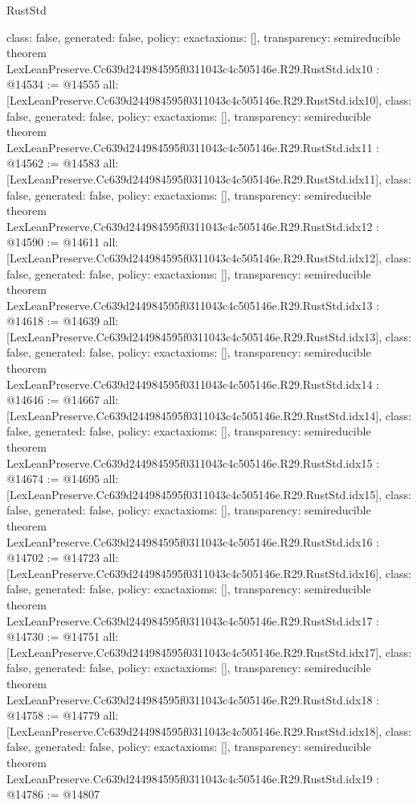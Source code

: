\begin{lexlean}{RustStd}
\begin{coremodule}
{  class: false,
  generated: false,
  policy: exact{axioms: []},
  transparency: semireducible
}
theorem LexLeanPreserve.Cc639d244984595f0311043c4c505146e.R29.RustStd.idx10 : @14534 := @14555 {
  all: [LexLeanPreserve.Cc639d244984595f0311043c4c505146e.R29.RustStd.idx10],
  class: false,
  generated: false,
  policy: exact{axioms: []},
  transparency: semireducible
}
theorem LexLeanPreserve.Cc639d244984595f0311043c4c505146e.R29.RustStd.idx11 : @14562 := @14583 {
  all: [LexLeanPreserve.Cc639d244984595f0311043c4c505146e.R29.RustStd.idx11],
  class: false,
  generated: false,
  policy: exact{axioms: []},
  transparency: semireducible
}
theorem LexLeanPreserve.Cc639d244984595f0311043c4c505146e.R29.RustStd.idx12 : @14590 := @14611 {
  all: [LexLeanPreserve.Cc639d244984595f0311043c4c505146e.R29.RustStd.idx12],
  class: false,
  generated: false,
  policy: exact{axioms: []},
  transparency: semireducible
}
theorem LexLeanPreserve.Cc639d244984595f0311043c4c505146e.R29.RustStd.idx13 : @14618 := @14639 {
  all: [LexLeanPreserve.Cc639d244984595f0311043c4c505146e.R29.RustStd.idx13],
  class: false,
  generated: false,
  policy: exact{axioms: []},
  transparency: semireducible
}
theorem LexLeanPreserve.Cc639d244984595f0311043c4c505146e.R29.RustStd.idx14 : @14646 := @14667 {
  all: [LexLeanPreserve.Cc639d244984595f0311043c4c505146e.R29.RustStd.idx14],
  class: false,
  generated: false,
  policy: exact{axioms: []},
  transparency: semireducible
}
theorem LexLeanPreserve.Cc639d244984595f0311043c4c505146e.R29.RustStd.idx15 : @14674 := @14695 {
  all: [LexLeanPreserve.Cc639d244984595f0311043c4c505146e.R29.RustStd.idx15],
  class: false,
  generated: false,
  policy: exact{axioms: []},
  transparency: semireducible
}
theorem LexLeanPreserve.Cc639d244984595f0311043c4c505146e.R29.RustStd.idx16 : @14702 := @14723 {
  all: [LexLeanPreserve.Cc639d244984595f0311043c4c505146e.R29.RustStd.idx16],
  class: false,
  generated: false,
  policy: exact{axioms: []},
  transparency: semireducible
}
theorem LexLeanPreserve.Cc639d244984595f0311043c4c505146e.R29.RustStd.idx17 : @14730 := @14751 {
  all: [LexLeanPreserve.Cc639d244984595f0311043c4c505146e.R29.RustStd.idx17],
  class: false,
  generated: false,
  policy: exact{axioms: []},
  transparency: semireducible
}
theorem LexLeanPreserve.Cc639d244984595f0311043c4c505146e.R29.RustStd.idx18 : @14758 := @14779 {
  all: [LexLeanPreserve.Cc639d244984595f0311043c4c505146e.R29.RustStd.idx18],
  class: false,
  generated: false,
  policy: exact{axioms: []},
  transparency: semireducible
}
theorem LexLeanPreserve.Cc639d244984595f0311043c4c505146e.R29.RustStd.idx19 : @14786 := @14807 {
}
\end{coremodule}
\end{lexlean}
